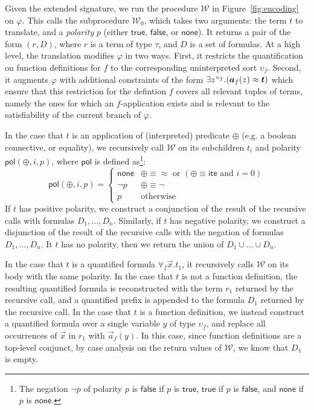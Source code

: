 \documentclass[runningheads,a4paper]{llncs}
\newcommand{\con}[1]{\mathsf{#1}}
\newcommand{\teq}{\approx}
\newcommand{\conv}{\mathcal{W}}
\newcommand{\pnone}{\con{none}}
\newcommand{\ptrue}{\con{true}}
\newcommand{\pfalse}{\con{false}}
\newcommand{\pol}{\con{pol}}
\newcommand{\lite}{\con{ite}}
\newcommand{\boolop}{\oplus}
\newcommand{\forallf}[1]{\forall_{#1}}
\newcommand{\vecfarg}[1]{\vec{a}_{#1}}
\newcommand{\fargsort}[1]{\upsilon_{#1}}
\newcommand{\vthinspace}{\kern+0.083333em}
\newcommand{\typ}[1]{^{\vthinspace #1}}
\begin{document}
Given the extended signature, we run the procedure $\conv$ in Figure~\ref{fig:encoding} on $\varphi$.
This calls the subprocedure $\conv_0$, which takes two arguments: the term $t$ to translate, and a \emph{polarity} $p$ (either $\ptrue$, $\pfalse$, or $\pnone$).
It returns a pair of the form $( r, D )$, where $r$ is a term of type $\tau$, and $D$ is a set of formulas.
At a high level, the translation modifies $\varphi$ in two ways.
First, it restricts the quantification on function definitions for $f$ to the corresponding uninterpreted sort $\fargsort{f}$.
Second, it augments $\varphi$ with additional constraints of the form $\exists z\typ{\fargsort{f}}. ( \vecfarg{f}( z ) \teq \vec t )$
which ensure that this restriction for the defintion $f$ covers all relevant tuples of terms,
namely the ones for which an $f$-application exists and is relevant to the satisfiability of the current branch of $\varphi$.

In the case that $t$ is an application of (interpreted) predicate $\boolop$ (e.g. a boolean connective, or equality),
we recursively call $\conv$ on its subchildren $t_i$ and polarity $\pol( \boolop, i, p )$, where $\pol$ is defined as\footnote{The negation $\neg p$ of polarity $p$ is 
$\pfalse$ if $p$ is $\ptrue$,
$\ptrue$ if $p$ is $\pfalse$, and
$\pnone$ if $p$ is $\pnone$.}:
\begin{equation*}
\pol( \boolop, i, p ) = \begin{cases}
                         \pnone & \boolop \equiv \teq \text{ or } ( \boolop \equiv \lite \text{ and } i=0 ) \\
                         \neg p & \boolop \equiv \neg \\
                         p & \text{otherwise}
                         \end{cases}
\end{equation*}
If $t$ has positive polarity,
we construct a conjunction of the result of the recursive calls with formulas $D_1, \ldots, D_n$.
Similarly, if $t$ has negative polarity,
we construct a disjunction of the result of the recursive calls with the negation of formulas $D_1, \ldots, D_n$.
It $t$ has no polarity,
then we return the union of $D_1 \cup \ldots \cup D_n$.

In the case that $t$ is a quantified formula $\forallf{f} \vec x. t_1$, it recursively calls $\conv$ on its body with the same polarity.
In the case that $t$ is not a function definition, 
the resulting quantified formula is reconstructed with the term $r_1$ returned by the recursive call,
and a quantified prefix is appended to the formula $D_1$ returned by the recursive call.
In the case that $t$ is a function definition,
we instead construct a quantified formula over a single variable $y$ of type $\fargsort{f}$,
and replace all occurrences of $\vec x$ in $r_1$ with $\vecfarg{f}( y )$.
In this case, since function definitions are a top-level conjunct, by case analysis on the return values of $\conv$, we know that $D_1$ is empty.
\end{document}
